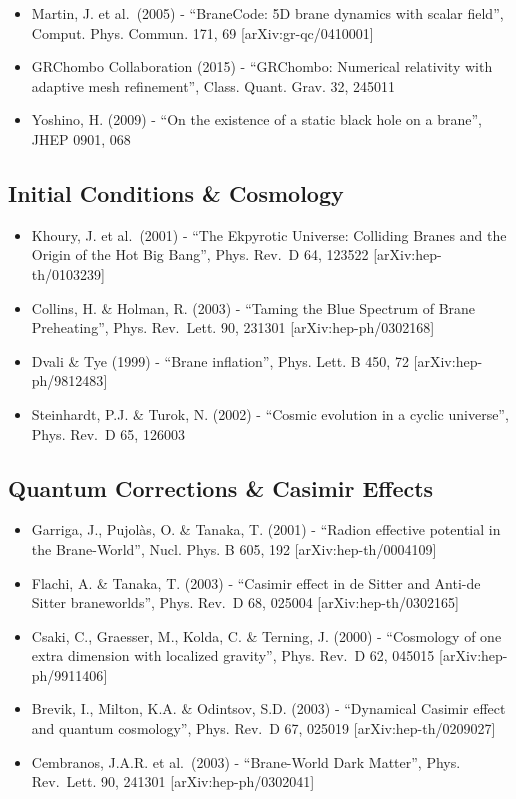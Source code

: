 \documentclass[
  11pt,
]{report}
\providecommand{\tightlist}{%
  \setlength{\itemsep}{0pt}\setlength{\parskip}{0pt}}
\begin{document}
\begin{itemize}
\tightlist
\item
  Martin, J. et al.~(2005) - ``BraneCode: 5D brane dynamics with scalar
  field'', Comput. Phys. Commun. 171, 69 {[}arXiv:gr-qc/0410001{]}
\item
  GRChombo Collaboration (2015) - ``GRChombo: Numerical relativity with
  adaptive mesh refinement'', Class. Quant. Grav. 32, 245011
\item
  Yoshino, H. (2009) - ``On the existence of a static black hole on a
  brane'', JHEP 0901, 068
\end{itemize}

\subsection{Initial Conditions \&
Cosmology}\label{initial-conditions-cosmology}

\begin{itemize}
\tightlist
\item
  Khoury, J. et al.~(2001) - ``The Ekpyrotic Universe: Colliding Branes
  and the Origin of the Hot Big Bang'', Phys. Rev.~D 64, 123522
  {[}arXiv:hep-th/0103239{]}
\item
  Collins, H. \& Holman, R. (2003) - ``Taming the Blue Spectrum of Brane
  Preheating'', Phys. Rev.~Lett. 90, 231301 {[}arXiv:hep-ph/0302168{]}
\item
  Dvali \& Tye (1999) - ``Brane inflation'', Phys. Lett. B 450, 72
  {[}arXiv:hep-ph/9812483{]}
\item
  Steinhardt, P.J. \& Turok, N. (2002) - ``Cosmic evolution in a cyclic
  universe'', Phys. Rev.~D 65, 126003
\end{itemize}

\subsection{Quantum Corrections \& Casimir
Effects}\label{quantum-corrections-casimir-effects}

\begin{itemize}
\tightlist
\item
  Garriga, J., Pujolàs, O. \& Tanaka, T. (2001) - ``Radion effective
  potential in the Brane-World'', Nucl. Phys. B 605, 192
  {[}arXiv:hep-th/0004109{]}
\item
  Flachi, A. \& Tanaka, T. (2003) - ``Casimir effect in de Sitter and
  Anti-de Sitter braneworlds'', Phys. Rev.~D 68, 025004
  {[}arXiv:hep-th/0302165{]}
\item
  Csaki, C., Graesser, M., Kolda, C. \& Terning, J. (2000) - ``Cosmology
  of one extra dimension with localized gravity'', Phys. Rev.~D 62,
  045015 {[}arXiv:hep-ph/9911406{]}
\item
  Brevik, I., Milton, K.A. \& Odintsov, S.D. (2003) - ``Dynamical
  Casimir effect and quantum cosmology'', Phys. Rev.~D 67, 025019
  {[}arXiv:hep-th/0209027{]}
\item
  Cembranos, J.A.R. et al.~(2003) - ``Brane-World Dark Matter'', Phys.
  Rev.~Lett. 90, 241301 {[}arXiv:hep-ph/0302041{]}
\end{itemize}
\end{document}
